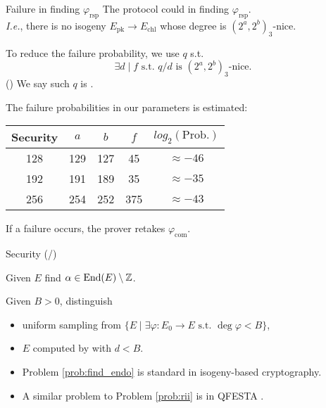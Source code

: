 \begin{frame}{Failure in finding $\varphi_\mathrm{rsp}$}
    The protocol could  in finding $\varphi_\mathrm{rsp}$.\\[3pt]
    \textit{I.e.}, there is no isogeny $E_\mathrm{pk} \to E_\mathrm{chl}$ whose degree is $(2^a, 2^b)_3$-nice.

    \vspace{10pt}
    To reduce the failure probability, we use $q$ s.t.
    $$
        \exists d \mid f \text{ s.t. } q/d \text{ is $(2^a, 2^b)_3$-nice}.
    $$
    ()
    We say such $q$ is .

    \vspace{10pt}
    The failure probabilities in our parameters is estimated:
    \begin{table}
        \begin{center}
            \begin{tabular}{c|c|c|c|c}
                Security & $a$ & $b$ & $f$ & $log_2(\text{Prob.})$ \\
                \hline
                128 & 129 & 127 & 45 & $\approx -46$ \\
                192 & 191 & 189 & 35 & $\approx -35$ \\
                256 & 254 & 252 & 375 & $\approx -43$
            \end{tabular}
        \end{center}
    \end{table}
    If a failure occurs, the prover retakes $\varphi_{\mathrm{com}}$.
\end{frame}

\newcommand*{\securitytotal}{\total{security_cnt}}
\begin{frame}{Security (/\securitytotal{})}
    \begin{prob}\label{prob:find_endo}
        Given $E$ find $\alpha \in \mathrm{End}(E)\setminus\mathbb{Z}$.
    \end{prob}

    \begin{prob}\label{prob:rii}
        Given $B > 0$, distinguish
        \begin{itemize}
            \item uniform sampling from $\{E \mid \exists\varphi: E_0 \to E \text{ s.t. } \deg\varphi < B\}$,
            \item $E$ computed by  with $d < B$. 
        \end{itemize}
    \end{prob}

    \vspace{10pt}
    \begin{itemize}
        \item Problem \ref{prob:find_endo} is standard in isogeny-based cryptography.
        \item A similar problem to Problem \ref{prob:rii} is in QFESTA \cite{C:NakOnu24}.
    \end{itemize}
\end{frame}

